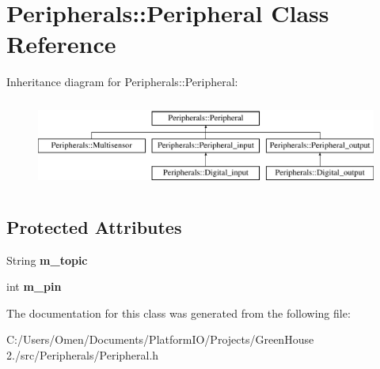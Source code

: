 \hypertarget{class_peripherals_1_1_peripheral}{}\section{Peripherals\+:\+:Peripheral Class Reference}
\label{class_peripherals_1_1_peripheral}
Inheritance diagram for Peripherals\+:\+:Peripheral\+:\begin{figure}[H]
\begin{center}
\leavevmode
\includegraphics[height=2.931937cm]{class_peripherals_1_1_peripheral}
\end{center}
\end{figure}
\subsection*{Protected Attributes}
\begin{DoxyCompactItemize}
\item 
\mbox{\label{class_peripherals_1_1_peripheral_af6113e4453fbbc6574638b9261f7f848}} 
String {\bfseries m\+\_\+topic}
\item 
\mbox{\label{class_peripherals_1_1_peripheral_aa68815bd2a4ca91c460a2c9c4ab9b1fe}} 
int {\bfseries m\+\_\+pin}
\end{DoxyCompactItemize}


The documentation for this class was generated from the following file\+:\begin{DoxyCompactItemize}
\item 
C\+:/\+Users/\+Omen/\+Documents/\+Platform\+I\+O/\+Projects/\+Green\+House 2./src/\+Peripherals/Peripheral.\+h\end{DoxyCompactItemize}
